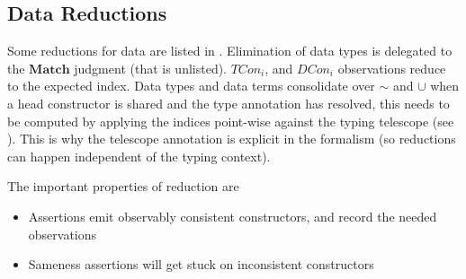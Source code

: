 \subsection{Data Reductions}

Some reductions for data are listed in .
Elimination of data types is delegated to the $\mathbf{Match}$ judgment (that is unlisted). 
$TCon_{i}$, and $DCon_{i}$ observations reduce to the expected index.
Data types and data terms consolidate over $\sim$ and $\cup$ when a head constructor is shared and the type annotation has resolved, this needs to be computed by applying the indices point-wise against the typing telescope (see ).
This is why the telescope annotation is explicit in the formalism (so reductions can happen independent of the typing context). 

The important properties of reduction are 
\begin{itemize}
\item Assertions emit observably consistent constructors, and record the needed observations
\item Sameness assertions will get stuck on inconsistent constructors
\end{itemize}

